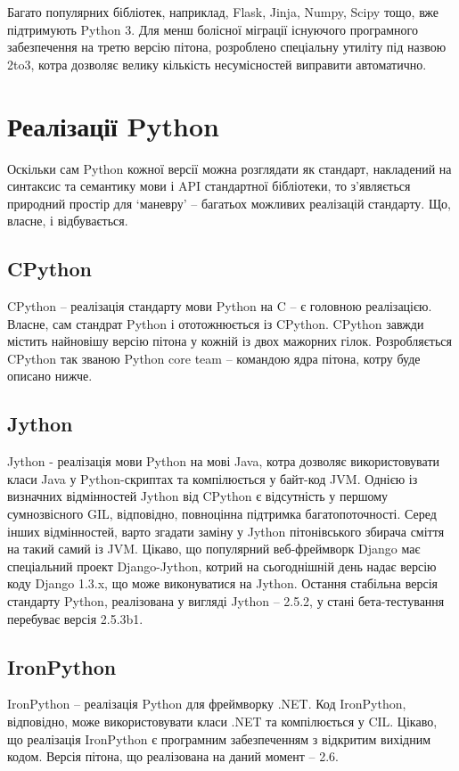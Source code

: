 \documentclass[a4paper, 12pt]{article}
\begin{document}
Багато популярних бібліотек, наприклад, Flask, Jinja, Numpy, Scipy тощо, вже підтримують
Python 3. Для менш болісної міграції існуючого програмного забезпечення на третю версію
пітона, розроблено спеціальну утиліту під назвою 2to3, котра дозволяє велику кількість
несумісностей виправити автоматично.

\section{Реалізації Python}
Оскільки сам Python кожної версії можна розглядати як стандарт, накладений на синтаксис та
семантику мови і API стандартної бібліотеки, то з'являється природний простір для `маневру'
 -- багатьох можливих реалізацій стандарту. Що, власне, і відбувається.

\subsection{CPython}
CPython -- реалізація стандарту мови Python на C -- є головною реалізацією. Власне, сам
стандрат Python і ототожнюється із CPython. CPython завжди містить найновішу версію пітона 
у кожній із двох мажорних гілок. Розробляється CPython так званою Python core team -- 
командою ядра пітона, котру буде описано нижче.


\subsection{Jython}
Jython - реалізація мови Python на мові Java, котра дозволяє використовувати класи Java у 
Python-скриптах та компілюється у байт-код JVM. Однією із визначних відмінностей Jython від
CPython є відсутність у першому сумнозвісного GIL, відповідно, повноцінна підтримка 
багатопоточності. Серед інших відмінностей, варто згадати заміну у Jython пітонівського 
збирача сміття на такий самий із JVM.
Цікаво, що популярний веб-фреймворк Django має спеціальний проект Django-Jython, котрий на
сьогоднішній день надає версію коду Django 1.3.x, що може виконуватися на Jython.
Остання стабільна версія стандарту Python, реалізована у вигляді Jython -- 2.5.2, у стані 
бета-тестування перебуває версія 2.5.3b1.

\subsection{IronPython}
IronPython -- реалізація Python для фреймворку .NET. Код IronPython, відповідно, може 
використовувати класи .NET та компілюється у CIL. Цікаво, що реалізація IronPython є 
програмним забезпеченням з відкритим вихідним кодом. Версія пітона, що реалізована на даний 
момент -- 2.6.
\end{document}
